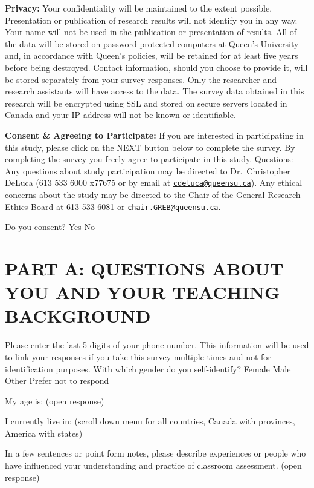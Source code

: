 \documentclass[
]{book}
\begin{document}
\textbf{Privacy:} Your confidentiality will be maintained to the extent possible. Presentation or publication of research results will not identify you in any way. Your name will not be used in the publication or presentation of results. All of the data will be stored on password-protected computers at Queen's University and, in accordance with Queen's policies, will be retained for at least five years before being destroyed. Contact information, should you choose to provide it, will be stored separately from your survey responses. Only the researcher and research assistants will have access to the data. The survey data obtained in this research will be encrypted using SSL and stored on secure servers located in Canada and your IP address will not be known or identifiable.

\textbf{Consent \& Agreeing to Participate:} If you are interested in participating in this study, please click on the NEXT button below to complete the survey. By completing the survey you freely agree to participate in this study.
Questions: Any questions about study participation may be directed to Dr.~Christopher DeLuca (613 533 6000 x77675 or by email at \href{mailto:cdeluca@queensu.ca}{\nolinkurl{cdeluca@queensu.ca}}). Any ethical concerns about the study may be directed to the Chair of the General Research Ethics Board at 613-533-6081 or \href{mailto:chair.GREB@queensu.ca}{\nolinkurl{chair.GREB@queensu.ca}}.

Do you consent?
Yes No

\hypertarget{part-a-questions-about-you-and-your-teaching-background}{%
\section{PART A: QUESTIONS ABOUT YOU AND YOUR TEACHING BACKGROUND}\label{part-a-questions-about-you-and-your-teaching-background}}

Please enter the last 5 digits of your phone number. This information will be used to link your responses if you take this survey multiple times and not for identification purposes.
With which gender do you self-identify?
Female
Male
Other
Prefer not to respond

My age is: (open response)

I currently live in: (scroll down menu for all countries, Canada with provinces, America with states)

In a few sentences or point form notes, please describe experiences or people who have influenced your understanding and practice of classroom assessment. (open response)
\end{document}
